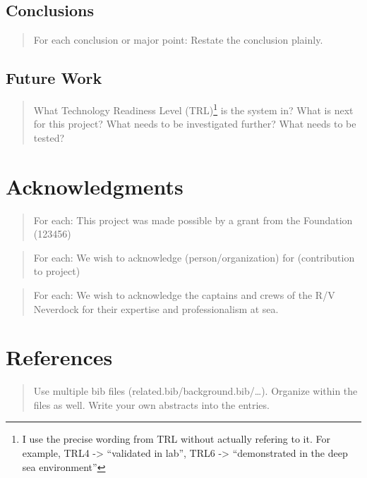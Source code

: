 \documentclass[
  10pt,
  draftcls,
  technote,
  letterpaper,
  oneside,
  onecolumn]{IEEEtran}
\begin{document}
\hypertarget{conclusions}{%
\subsection{Conclusions}\label{conclusions}}

\begin{quote}
For each conclusion or major point: Restate the conclusion plainly.
\end{quote}

\hypertarget{future-work}{%
\subsection{Future Work}\label{future-work}}

\begin{quote}
What Technology Readiness Level (TRL)\footnote{I use the precise wording
  from TRL without actually refering to it. For example, TRL4
  -\textgreater{} ``validated in lab'', TRL6 -\textgreater{}
  ``demonstrated in the deep sea environment''} is the system in? What
is next for this project? What needs to be investigated further? What
needs to be tested?
\end{quote}

\hypertarget{acknowledgments}{%
\section{Acknowledgments}\label{acknowledgments}}

\begin{quote}
For each: This project was made possible by a grant from the Foundation
(123456)
\end{quote}

\begin{quote}
For each: We wish to acknowledge (person/organization) for (contribution
to project)
\end{quote}

\begin{quote}
For each: We wish to acknowledge the captains and crews of the R/V
Neverdock for their expertise and professionalism at sea.
\end{quote}

\hypertarget{references}{%
\section*{References}\label{references}}

\begin{quote}
Use multiple bib files (related.bib/background.bib/\ldots). Organize
within the files as well. Write your own abstracts into the entries.
\end{quote}
\end{document}

